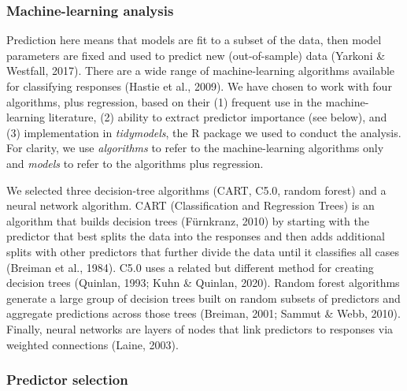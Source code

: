 \documentclass[
  english,
  ,pub,floatsintext]{apa6}
\begin{document}
\hypertarget{machine-learning-analysis}{%
\subsubsection{Machine-learning analysis}\label{machine-learning-analysis}}

Prediction here means that models are fit to a subset of the data, then model parameters are fixed and used to predict new (out-of-sample) data (Yarkoni \& Westfall, 2017). There are a wide range of machine-learning algorithms available for classifying responses (Hastie et al., 2009). We have chosen to work with four algorithms, plus regression, based on their (1) frequent use in the machine-learning literature, (2) ability to extract predictor importance (see below), and (3) implementation in \emph{tidymodels}, the R package we used to conduct the analysis. For clarity, we use \emph{algorithms} to refer to the machine-learning algorithms only and \emph{models} to refer to the algorithms plus regression.

We selected three decision-tree algorithms (CART, C5.0, random forest) and a neural network algorithm. CART (Classification and Regression Trees) is an algorithm that builds decision trees (Fürnkranz, 2010) by starting with the predictor that best splits the data into the responses and then adds additional splits with other predictors that further divide the data until it classifies all cases (Breiman et al., 1984). C5.0 uses a related but different method for creating decision trees (Quinlan, 1993; Kuhn \& Quinlan, 2020). Random forest algorithms generate a large group of decision trees built on random subsets of predictors and aggregate predictions across those trees (Breiman, 2001; Sammut \& Webb, 2010). Finally, neural networks are layers of nodes that link predictors to responses via weighted connections (Laine, 2003).

\hypertarget{predictor-selection}{%
\subsubsection{Predictor selection}\label{predictor-selection}}
\end{document}
